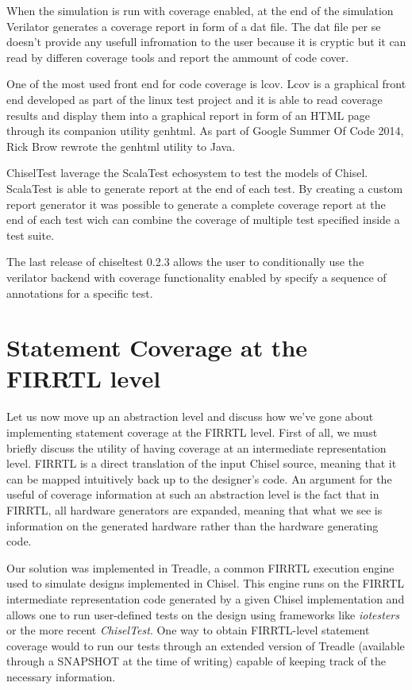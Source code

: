 \documentclass[conference]{IEEEtran}
\begin{document}
When the simulation is run with coverage enabled, at the end of the simulation Verilator generates a coverage report in form of a dat file. The dat file per se doesn't provide any usefull infromation to the user because it is cryptic but it can read by differen coverage tools and report the ammount of code cover. 

One of the most used front end for code coverage is lcov. Lcov is a graphical front end developed as part of the linux test project and it is able to read coverage results and display them into a graphical report in form of an HTML page through its companion utility genhtml. As part of Google Summer Of Code 2014, Rick Brow rewrote the genhtml utility to Java.

ChiselTest laverage the ScalaTest echosystem to test the models of Chisel. ScalaTest is able to generate report at the end of each test. By creating a custom report generator it was possible to generate a complete coverage report at the end of each test wich can combine the coverage of multiple test specified inside a test suite.

The last release of chiseltest 0.2.3 allows the user to conditionally use the verilator backend with coverage functionality enabled by specify a sequence of annotations
for a specific test.

\section{Statement Coverage at the FIRRTL level}  
Let us now move up an abstraction level and discuss how we've gone about implementing statement coverage at the FIRRTL level. First of all, we must briefly discuss the utility of having coverage at an intermediate representation level. FIRRTL is a direct translation of the input Chisel source, meaning that it can be mapped intuitively back up to the designer's code. An argument for the useful of coverage information at such an abstraction level is the fact that in FIRRTL, all hardware generators are expanded, meaning that what we see is information on the generated hardware rather than the hardware generating code. 

Our solution was implemented in Treadle, a common FIRRTL execution engine used to simulate designs implemented in Chisel. This engine runs on the FIRRTL intermediate representation code generated by a given Chisel implementation and allows one to run user-defined tests on the design using frameworks like \textit{iotesters} or the more recent \textit{ChiselTest}. One way to obtain FIRRTL-level statement coverage would to run our tests through an extended version of Treadle (available through a SNAPSHOT at the time of writing) capable of keeping track of the necessary information.
\end{document}
